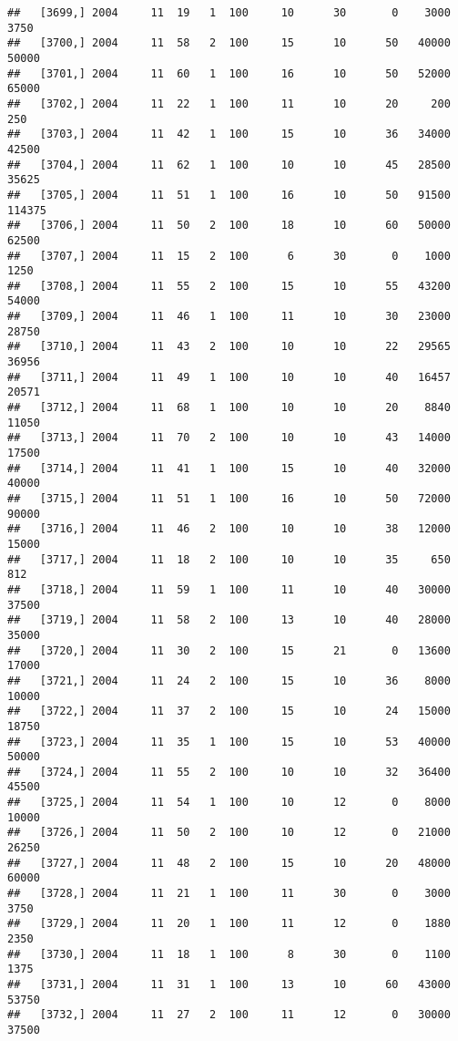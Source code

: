 \documentclass{article}\usepackage[]{graphicx}\usepackage[]{color}
\makeatletter
\newenvironment{kframe}{%
 \def\at@end@of@kframe{}%
 \ifinner\ifhmode%
  \def\at@end@of@kframe{\end{minipage}}%
  \begin{minipage}{\columnwidth}%
 \fi\fi%
 \def\FrameCommand##1{\hskip\@totalleftmargin \hskip-\fboxsep
 \colorbox{shadecolor}{##1}\hskip-\fboxsep
     \hskip-\linewidth \hskip-\@totalleftmargin \hskip\columnwidth}%
 \MakeFramed {\advance\hsize-\width
   \@totalleftmargin\z@ \linewidth\hsize
   \@setminipage}}%
 {\par\unskip\endMakeFramed%
 \at@end@of@kframe}
\newenvironment{knitrout}{}{} %
\makeatother
\begin{document}
\begin{knitrout}
\begin{kframe}
\begin{verbatim}
##   [3699,] 2004     11  19   1  100     10      30       0    3000    3750
##   [3700,] 2004     11  58   2  100     15      10      50   40000   50000
##   [3701,] 2004     11  60   1  100     16      10      50   52000   65000
##   [3702,] 2004     11  22   1  100     11      10      20     200     250
##   [3703,] 2004     11  42   1  100     15      10      36   34000   42500
##   [3704,] 2004     11  62   1  100     10      10      45   28500   35625
##   [3705,] 2004     11  51   1  100     16      10      50   91500  114375
##   [3706,] 2004     11  50   2  100     18      10      60   50000   62500
##   [3707,] 2004     11  15   2  100      6      30       0    1000    1250
##   [3708,] 2004     11  55   2  100     15      10      55   43200   54000
##   [3709,] 2004     11  46   1  100     11      10      30   23000   28750
##   [3710,] 2004     11  43   2  100     10      10      22   29565   36956
##   [3711,] 2004     11  49   1  100     10      10      40   16457   20571
##   [3712,] 2004     11  68   1  100     10      10      20    8840   11050
##   [3713,] 2004     11  70   2  100     10      10      43   14000   17500
##   [3714,] 2004     11  41   1  100     15      10      40   32000   40000
##   [3715,] 2004     11  51   1  100     16      10      50   72000   90000
##   [3716,] 2004     11  46   2  100     10      10      38   12000   15000
##   [3717,] 2004     11  18   2  100     10      10      35     650     812
##   [3718,] 2004     11  59   1  100     11      10      40   30000   37500
##   [3719,] 2004     11  58   2  100     13      10      40   28000   35000
##   [3720,] 2004     11  30   2  100     15      21       0   13600   17000
##   [3721,] 2004     11  24   2  100     15      10      36    8000   10000
##   [3722,] 2004     11  37   2  100     15      10      24   15000   18750
##   [3723,] 2004     11  35   1  100     15      10      53   40000   50000
##   [3724,] 2004     11  55   2  100     10      10      32   36400   45500
##   [3725,] 2004     11  54   1  100     10      12       0    8000   10000
##   [3726,] 2004     11  50   2  100     10      12       0   21000   26250
##   [3727,] 2004     11  48   2  100     15      10      20   48000   60000
##   [3728,] 2004     11  21   1  100     11      30       0    3000    3750
##   [3729,] 2004     11  20   1  100     11      12       0    1880    2350
##   [3730,] 2004     11  18   1  100      8      30       0    1100    1375
##   [3731,] 2004     11  31   1  100     13      10      60   43000   53750
##   [3732,] 2004     11  27   2  100     11      12       0   30000   37500

\end{verbatim}
\end{kframe}
\end{knitrout}
\end{document}
